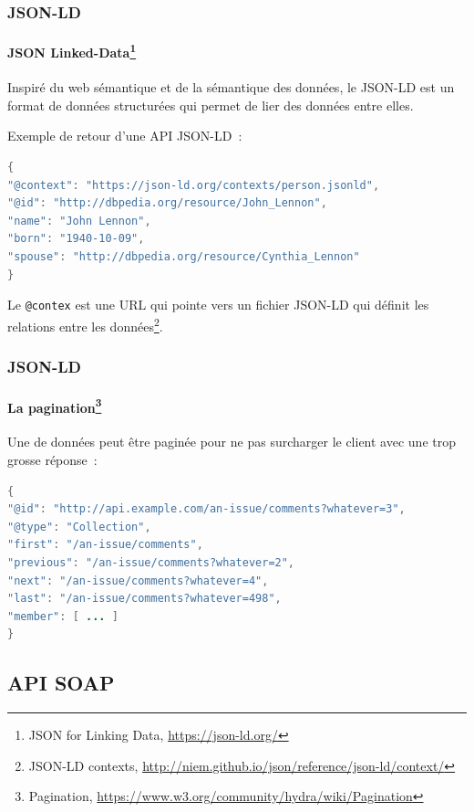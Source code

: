 \documentclass{beamer}
\begin{document}
    \begin{frame}[fragile]
        \transdissolve
        \frametitle{JSON-LD}
        \framesubtitle{JSON Linked-Data\footnote{JSON for Linking Data, \url{https://json-ld.org/}}}
        Inspiré du web sémantique et de la sémantique des données, le JSON-LD est un format de données structurées qui permet de lier des données entre elles.

        \bigbreak
        Exemple de retour d'une API JSON-LD~:
        \begin{lstlisting}[language=java,basicstyle=\ttfamily\tiny]
{
"@context": "https://json-ld.org/contexts/person.jsonld",
"@id": "http://dbpedia.org/resource/John_Lennon",
"name": "John Lennon",
"born": "1940-10-09",
"spouse": "http://dbpedia.org/resource/Cynthia_Lennon"
}
        \end{lstlisting}
        Le \lstinline{@contex} est une URL qui pointe vers un fichier JSON-LD qui définit les relations entre les données\footnote{JSON-LD contexts, \url{http://niem.github.io/json/reference/json-ld/context/}}.
    \end{frame}

    \begin{frame}[fragile]
        \transdissolve
        \frametitle{JSON-LD}
        \framesubtitle{La pagination\footnote{Pagination, \url{https://www.w3.org/community/hydra/wiki/Pagination}}}
        Une  de données peut être paginée pour ne pas surcharger le client avec une trop grosse réponse~:
        \begin{lstlisting}[language=java]
{
"@id": "http://api.example.com/an-issue/comments?whatever=3",
"@type": "Collection",
"first": "/an-issue/comments",
"previous": "/an-issue/comments?whatever=2",
"next": "/an-issue/comments?whatever=4",
"last": "/an-issue/comments?whatever=498",
"member": [ ... ]
}
        \end{lstlisting}
    \end{frame}

    \subsection{API SOAP}\label{subsec:api-soap}
\end{document}
